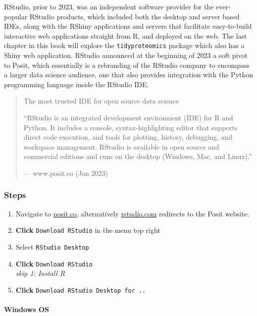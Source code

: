 \documentclass[
]{book}
\providecommand{\tightlist}{%
  \setlength{\itemsep}{0pt}\setlength{\parskip}{0pt}}
\begin{document}
RStudio, prior to 2023, was an independent software provider for the ever-popular RStudio products, which included both the desktop and server based IDEs, along with the RShiny applications and servers that facilitate easy-to-build interactive web applications straight from R, and deployed on the web. The last chapter in this book will explore the \texttt{tidyproteomics} package which also has a Shiny web application. RStudio announced at the beginning of 2023 a soft pivot to Posit, which essentially is a rebranding of the RStudio company to encompass a larger data science audience, one that also provides integration with the Python programming language inside the RStudio IDE.

\begin{quote}
The most trusted IDE for open source data science

``RStudio is an integrated development environment (IDE) for R and Python. It includes a console, syntax-highlighting editor that supports direct code execution, and tools for plotting, history, debugging, and workspace management. RStudio is available in open source and commercial editions and runs on the desktop (Windows, Mac, and Linux).''

--- www.posit.co (Jan 2023)
\end{quote}

\hypertarget{steps-1}{%
\subsubsection*{Steps}\label{steps-1}}

\begin{enumerate}
\def\labelenumi{\arabic{enumi}.}
\tightlist
\item
  Navigate to \href{https://posit.co/}{posit.co}, alternatively \href{https://rstudio.com/}{rstudio.com} redirects to the Posit website.
\item
  \textbf{Click} \texttt{Download\ RStudio} in the menu top right
\item
  Select \texttt{RStudio\ Desktop}
\item
  \textbf{Click} \texttt{Download\ RStudio}\\
  \emph{skip 1: Install R}
\item
  \textbf{Click} \texttt{Download\ RStudio\ Desktop\ for\ ..}
\end{enumerate}

\hypertarget{windows-os-1}{%
\paragraph*{Windows OS}\label{windows-os-1}}
\end{document}
